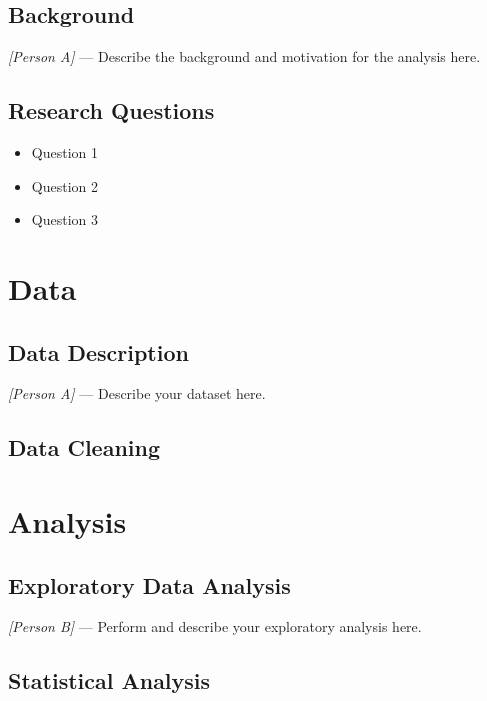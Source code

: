 \documentclass[
  english,
  12pt,
  11pt,
  a4paper,
  openany]{memoir}
\providecommand{\tightlist}{%
  \setlength{\itemsep}{0pt}\setlength{\parskip}{0pt}}
\begin{document}
\section{Background}\label{background}

\emph{{[}Person A{]}} --- Describe the background and motivation for the
analysis here.

\section{Research Questions}\label{research-questions}

\begin{itemize}
\tightlist
\item
  Question 1
\item
  Question 2
\item
  Question 3
\end{itemize}

\chapter{Data}\label{data}

\section{Data Description}\label{data-description}

\emph{{[}Person A{]}} --- Describe your dataset here.

\section{Data Cleaning}\label{data-cleaning}

\chapter{Analysis}\label{analysis}

\section{Exploratory Data Analysis}\label{exploratory-data-analysis}

\emph{{[}Person B{]}} --- Perform and describe your exploratory analysis
here.

\section{Statistical Analysis}\label{statistical-analysis}
\end{document}
